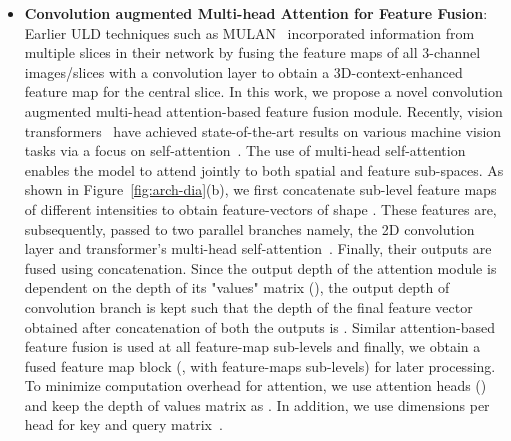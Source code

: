 \documentclass{bmvc2k}
\begin{document}
\begin{itemize}
\item \textbf{Convolution augmented Multi-head Attention for Feature Fusion}:
Earlier ULD techniques such as MULAN~\cite{yan2019mulan} incorporated information from multiple slices in their network by fusing the feature maps of all 3-channel images/slices with a convolution layer to obtain a 3D-context-enhanced feature map for the central slice. In this work, we propose a novel convolution augmented multi-head attention-based feature fusion module. Recently, vision transformers~\cite{DeiT, ViT, detr} have achieved state-of-the-art results on various machine vision tasks via a focus on self-attention~\cite{attentionisallyouneed}. The use of multi-head self-attention enables the model to attend jointly to both spatial and feature sub-spaces. As shown in Figure~\ref{fig:arch-dia}(b), we first concatenate sub-level feature maps  of  different intensities to obtain feature-vectors of shape . These features are, subsequently, passed to two parallel branches namely, the 2D convolution layer and transformer's multi-head self-attention~\cite{ViT}. Finally, their outputs are fused using concatenation. Since the output depth of the attention module is dependent on the depth of its "values" matrix (), the output depth of  convolution branch is kept such that the depth of the final feature vector obtained after concatenation of both the outputs is . Similar attention-based feature fusion is used at all  feature-map sub-levels and finally, we obtain a fused feature map block (, with  feature-maps sub-levels) for later processing. To minimize computation overhead for attention, we use  attention heads () and keep the depth of values matrix as . In addition, we use  dimensions per head for key and query matrix~\cite{aug_attention}.





\end{itemize}
\end{document}
